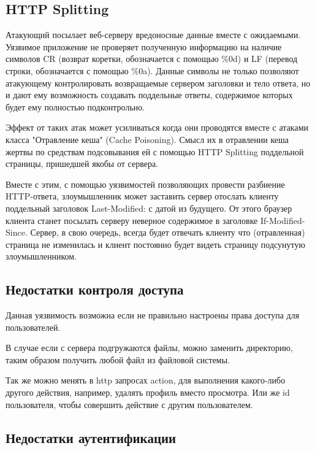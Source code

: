 \documentclass{article}
\begin{document}
\subsection{HTTP Splitting}

Атакующий посылает веб-серверу вредоносные данные вместе с ожидаемыми. Уязвимое приложение не проверяет полученную
информацию на наличие символов CR (возврат коретки, обозначается с помощью \%0d) и LF (перевод строки, обозначается
с помощью \%0a). Данные символы не только позволяют атакующему контролировать возвращаемые сервером заголовки и тело ответа,
но и дают ему возможность создавать поддельные ответы, содержимое которых будет ему полностью подконтрольно.

Эффект от таких атак может усиливаться когда они проводятся вместе с атаками класса "Отравление кеша" (Cache Poisoning).
Смысл их в отравлении кеша жертвы по средствам подсовывания ей с помощью HTTP Splitting поддельной страницы,
пришедшей якобы от сервера.

Вместе с этим, с помощью уязвимостей позволяющих провести разбиение HTTP-ответа, злоумышленник может заставить сервер
отослать клиенту поддельный заголовок Last-Modified: с датой из будущего. От этого браузер клиента станет посылать серверу
неверное содержимое в заголовке If-Modified-Since. Сервер, в свою очередь, всегда будет отвечать клиенту что (отравленная)
страница не изменилась и клиент постоянно будет видеть страницу подсунутую злоумышленником.

\subsection{Недостатки контроля доступа}

Данная уязвимость возможна если не правильно настроены права доступа для пользователей.

В случае если с сервера подгружаются файлы, можно заменить директорию, таким образом получить любой файл из файловой системы.

Так же можно менять в http запросах action, для выполнения какого-либо другого действия, например, удалять профиль вместо просмотра.
Или же id пользователя, чтобы совершить действие с другим пользователем.

\subsection{Недостатки аутентификации}
\end{document}
